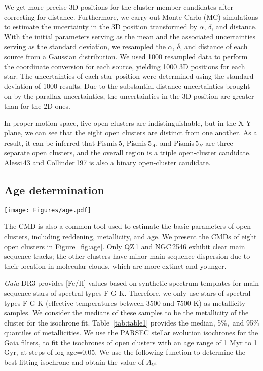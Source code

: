 \documentclass{aa} %
\begin{document}
We get more precise 3D positions for the cluster member candidates after correcting for distance. Furthermore, we carry out Monte Carlo (MC) simulations to estimate the uncertainty in the 3D position
transformed by $\alpha$, $\delta$, and distance. With the initial parameters serving as the mean and 
the associated uncertainties serving as the standard deviation, we resampled the $\alpha$, $\delta$, and 
distance of each source from a Gaussian distribution. We used 1000 resampled data to perform 
the coordinate conversion for each source, yielding 1000 3D positions for each star. The 
uncertainties of each star position were determined using the standard deviation of 1000 results. 
Due to the substantial distance uncertainties brought on by the parallax uncertainties, the 
uncertainties in the 3D position are greater than for the 2D ones.


In proper motion space, five open clusters are indistinguishable, but 
in the X-Y plane, we can see that the eight open clusters are distinct from one another. As a result, 
it can be inferred that Pismis\,5, Pismis$\,5_{A}$, and Pismis$\,5_{B}$ are three separate open clusters, 
and the overall region is a triple open-cluster candidate. Alessi\,43 and Collinder\,197 is also a binary open-cluster candidate.


\subsection{Age determination} \label{subsec:age}


\begin{figure*}
    \texttt{[image: Figures/age.pdf]}
    \centering
    \caption{CMDs of Pismis\,5, 
    Pismis$\,5_{A}$, Pismis$\,5_{B}$, QZ\,1, Alessi\,43, Collinder\,197, BH\,56, and NGC\,2546.
    The solid lines are the isochrones from PARSEC and the corresponding parameters are marked in 
    the figure. The dashed lines are the curve of equal-mass binaries.
    \label{fig:age}}
    \end{figure*}   
The CMD is also a common tool used to estimate the basic parameters of open 
clusters, including reddening, metallicity, and age. We present the CMDs of eight open clusters in 
Figure~\ref{fig:age}. Only QZ\,1 and NGC\,2546 exhibit clear main sequence tracks; the other 
clusters have minor main sequence dispersion due to their location in molecular clouds, which are 
more extinct and younger.

{\it Gaia} DR3 provides [Fe/H] values based on synthetic spectrum templates for main 
sequence stars of spectral types F-G-K. Therefore, we only use stars of spectral types 
F-G-K (effective temperatures between 3500 and 7500 K) as metallicity samples. We consider the medians 
of these samples to be the metallicity of the cluster for the isochrone fit. Table~\ref{tab:table1} 
provides the median, 5$\%,$ and 95$\%$ quantiles of metallicities. We use the PARSEC stellar evolution isochrones \citep{2012MNRAS.427..127B,2014MNRAS.444.2525C} for the Gaia filters, to fit the isochrones of open clusters with an age range of 1 Myr to 1 Gyr, at steps of log age=0.05.
We use the following function \citep{2019ApJS..245...32L} to determine the best-fitting isochrone and obtain the value of $A_V$:
\end{document}
